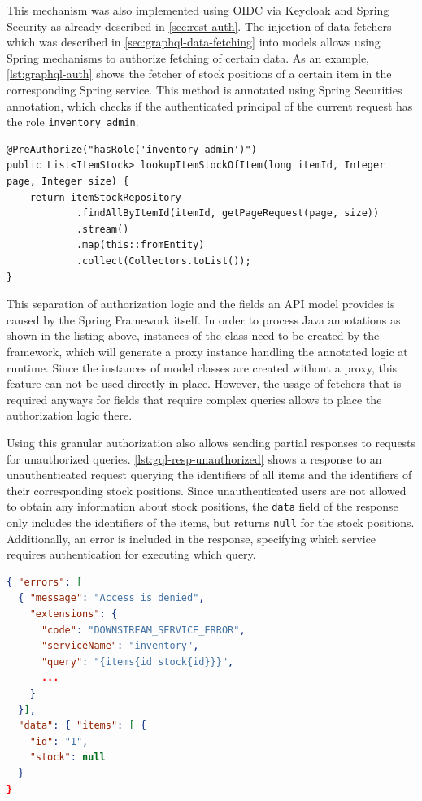 This mechanism was also implemented using \ac{OIDC} via Keycloak and Spring Security as already described in \autoref{sec:rest-auth}.
The injection of data fetchers which was described in \autoref{sec:graphql-data-fetching} into models allows using Spring mechanisms to authorize fetching of certain data.
As an example, \autoref{lst:graphql-auth} shows the fetcher of stock positions of a certain item in the corresponding Spring service.
This method is annotated using Spring Securities annotation, which checks if the authenticated principal of the current request has the role \texttt{inventory\_admin}.

\begin{lstlisting}[caption={Authorization for Retrieval of Individual Fields}, style=java-ext, label={lst:graphql-auth}]
@PreAuthorize("hasRole('inventory_admin')")
public List<ItemStock> lookupItemStockOfItem(long itemId, Integer page, Integer size) {
    return itemStockRepository
            .findAllByItemId(itemId, getPageRequest(page, size))
            .stream()
            .map(this::fromEntity)
            .collect(Collectors.toList());
}
\end{lstlisting}

This separation of authorization logic and the fields an \ac{API} model provides is caused by the Spring Framework itself.
In order to process Java annotations as shown in the listing above, instances of the class need to be created by the framework, which will generate a proxy instance handling the annotated logic at runtime.
Since the instances of model classes are created without a proxy, this feature can not be used directly in place.
However, the usage of fetchers that is required anyways for fields that require complex queries allows to place the authorization logic there.

Using this granular authorization also allows sending partial responses to requests for unauthorized queries.
\autoref{lst:gql-resp-unauthorized} shows a response to an unauthenticated request querying the identifiers of all items and the identifiers of their corresponding stock positions.
Since unauthenticated users are not allowed to obtain any information about stock positions, the \texttt{data} field of the response only includes the identifiers of the items, but returns \texttt{null} for the stock positions.
Additionally, an error is included in the response, specifying which service requires authentication for executing which query.

\begin{lstlisting}[caption={Response to an Unauthorzed Query}, language=json, label={lst:gql-resp-unauthorized}]
{ "errors": [
  { "message": "Access is denied",
    "extensions": { 
      "code": "DOWNSTREAM_SERVICE_ERROR",
      "serviceName": "inventory",
      "query": "{items{id stock{id}}}",
      ...
    }
  }],
  "data": { "items": [ {
    "id": "1",
    "stock": null
  }
}
\end{lstlisting}

